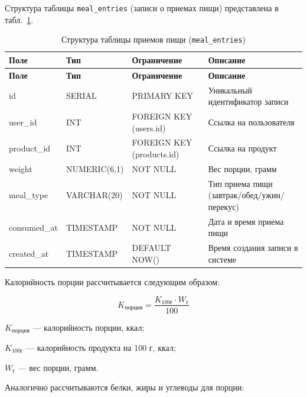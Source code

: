 Структура таблицы \texttt{meal\_entries} (записи о приемах пищи) представлена в табл.~\ref{tab:db_meal_entries}.

\begin{longtable}{|l|l|p{3.5cm}|p{5.5cm}|}
	\caption{Структура таблицы приемов пищи (\texttt{meal\_entries})} \label{tab:db_meal_entries} \\

	\hline
	\textbf{Поле} & \textbf{Тип} & \textbf{Ограничение} & \textbf{Описание} \\ \hline
	\endfirsthead
	
	\tabcont{\ref{tab:db_meal_entries}}
	\textbf{Поле} & \textbf{Тип} & \textbf{Ограничение} & \textbf{Описание} \\ \hline
	\endhead
	
	\hline
	\endfoot
	
	\hline
	\endlastfoot

	id & SERIAL & PRIMARY KEY & Уникальный идентификатор записи \\ \hline
	user\_id & INT & FOREIGN KEY (users.id) & Ссылка на пользователя \\ \hline
	product\_id & INT & FOREIGN KEY (products.id) & Ссылка на продукт \\ \hline
	weight & NUMERIC(6,1) & NOT NULL & Вес порции, грамм \\ \hline
	meal\_type & VARCHAR(20) & NOT NULL & Тип приема пищи (завтрак/обед/ужин/перекус) \\ \hline
	consumed\_at & TIMESTAMP & NOT NULL & Дата и время приема пищи \\ \hline
	created\_at & TIMESTAMP & DEFAULT NOW() & Время создания записи в системе \\ \hline
\end{longtable}


Калорийность порции рассчитывается следующим образом:

\begin{equation}
	K_{порция} = \frac{K_{100г} \cdot W_{г}}{100}
	\label{eq:calories_formula}
\end{equation}

\begin{where}
	\item $K_{порция}$ — калорийность порции, ккал;
	\item $K_{100г}$ — калорийность продукта на 100 г, ккал;
	\item $W_{г}$ — вес порции, грамм.
\end{where}

Аналогично рассчитываются белки, жиры и углеводы для порции:

